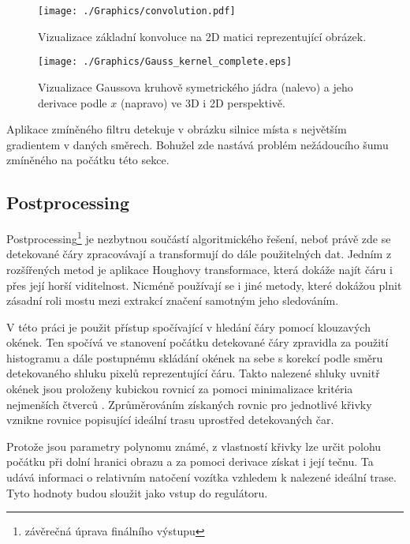 \documentclass[czech, bc, kky, he, iso690alph]{fasthesis}
\begin{document}
	                \begin{figure}[ht]
	                    \centering
	                    \texttt{[image: ./Graphics/convolution.pdf]}
	                    \caption{Vizualizace základní konvoluce na 2D matici reprezentující obrázek.}
	                    \label{pic:convolution}
	                \end{figure}
                
                	\begin{figure}[ht]
                		\centering
                		\texttt{[image: ./Graphics/Gauss\_kernel\_complete.eps]}
                		\caption{Vizualizace Gaussova kruhově symetrického jádra (nalevo) a jeho derivace podle \(x\) (napravo) ve 3D i 2D perspektivě.}
                		\label{pic:Gauss_kernel}
                	\end{figure}
                
                Aplikace zmíněného filtru detekuje v obrázku silnice místa s největším gradientem v daných směrech. Bohužel zde nastává problém nežádoucího šumu zmíněného na počátku této sekce.
                
            \subsection{Postprocessing}\label{chap:01_postprocessing}
                Postprocessing\footnote{závěrečná úprava finálního výstupu} je nezbytnou součástí algoritmického řešení, neboť právě zde se detekované čáry zpracovávají a transformují do dále použitelných dat. Jedním z rozšířených metod je aplikace Houghovy transformace, která dokáže najít čáru i přes její horší viditelnost. Nicméně používají se i jiné metody, které dokážou plnit zásadní roli mostu mezi extrakcí značení samotným jeho sledováním.
                
                V této práci je použit přístup spočívající v hledání čáry pomocí klouzavých okének. Ten spočívá ve stanovení počátku detekované čáry zpravidla za použití histogramu a dále postupnému skládání okének na sebe s korekcí podle směru detekovaného shluku pixelů reprezentující čáru. Takto nalezené shluky uvnitř okének jsou proloženy kubickou rovnicí za pomoci minimalizace kritéria nejmenších čtverců \cite{polyfit}. Zprůměrováním získaných rovnic pro jednotlivé křivky vznikne rovnice popisující ideální trasu uprostřed detekovaných čar.
                
                Protože jsou parametry polynomu známé, z vlastností křivky lze určit polohu počátku při dolní hranici obrazu a za pomoci derivace získat i její tečnu. Ta udává informaci o relativním natočení vozítka vzhledem k nalezené ideální trase. Tyto hodnoty budou sloužit jako vstup do regulátoru.
                
\end{document}
